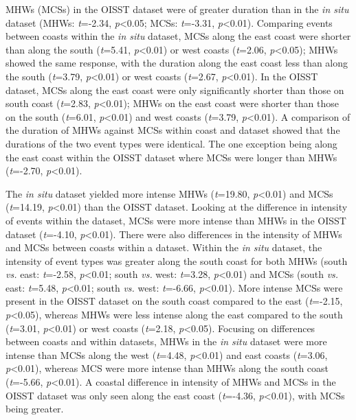 \documentclass[a4paper,10pt,review]{elsarticle}
\begin{document}
MHWs (MCSs) in the OISST dataset were of greater duration than in the \emph{in situ} dataset (MHWs: \emph{t}=-2.34, \emph{p}<0.05; MCSs: \emph{t}=-3.31, \emph{p}<0.01). Comparing events between coasts within the \emph{in situ} dataset, MCSs along the east coast were shorter than along the south (\emph{t}=5.41, \emph{p}<0.01) or west coasts (\emph{t}=2.06, \emph{p}<0.05); MHWs showed the same response, with the duration along the east coast less than along the south (\emph{t}=3.79, \emph{p}<0.01) or west coasts (\emph{t}=2.67, \emph{p}<0.01). In the OISST dataset, MCSs along the east coast were only significantly shorter than those on south coast (\emph{t}=2.83, \emph{p}<0.01); MHWs on the east coast were shorter than those on the south (\emph{t}=6.01, \emph{p}<0.01) and west coasts (\emph{t}=3.79, \emph{p}<0.01). A comparison of the duration of MHWs against MCSs within coast and dataset showed that the durations of the two event types were identical. The one exception being along the east coast within the OISST dataset where MCSs were longer than MHWs (\emph{t}=-2.70, \emph{p}<0.01).

The \emph{in situ} dataset yielded more intense MHWs (\emph{t}=19.80, \emph{p}<0.01) and MCSs (\emph{t}=14.19, \emph{p}<0.01) than the OISST dataset. Looking at the difference in intensity of events within the dataset, MCSs were more intense than MHWs in the OISST dataset (\emph{t}=-4.10, \emph{p}<0.01). There were also differences in the intensity of MHWs and MCSs between coasts within a dataset. Within the \emph{in situ} dataset, the intensity of event types was greater along the south coast for both MHWs (south \emph{vs.} east: \emph{t}=-2.58, \emph{p}<0.01; south \emph{vs.} west: \emph{t}=3.28, \emph{p}<0.01) and MCSs (south \emph{vs.} east: \emph{t}=5.48, \emph{p}<0.01; south \emph{vs.} west: \emph{t}=-6.66, \emph{p}<0.01). More intense MCSs were present in the OISST dataset on the south coast compared to the east (\emph{t}=-2.15, \emph{p}<0.05), whereas MHWs were less intense along the east compared to the south (\emph{t}=3.01, \emph{p}<0.01) or west coasts (\emph{t}=2.18, \emph{p}<0.05). Focusing on differences between coasts and within datasets, MHWs in the \emph{in situ} dataset were more intense than MCSs along the west (\emph{t}=4.48, \emph{p}<0.01) and east coasts (\emph{t}=3.06, \emph{p}<0.01), whereas MCS were more intense than MHWs along the south coast (\emph{t}=-5.66, \emph{p}<0.01). A coastal difference in intensity of MHWs and MCSs in the OISST dataset was only seen along the east coast (\emph{t}=-4.36, \emph{p}<0.01), with MCSs being greater.
\end{document}
